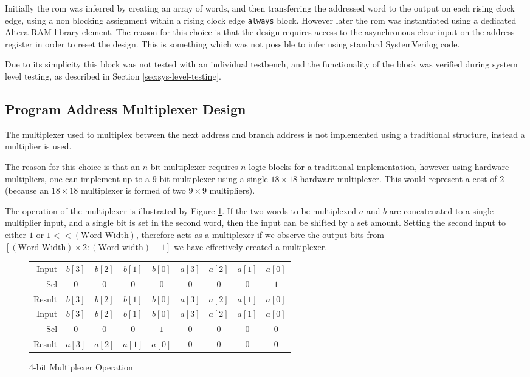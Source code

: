 Initially the \gls{rom} was inferred by creating an array of words, and then transferring the addressed word to the output on each rising clock edge, using a non blocking assignment within a rising clock edge \texttt{always} block. However later the \gls{rom} was instantiated using a dedicated Altera RAM library element. The reason for this choice is that the design requires access to the asynchronous clear input on the address register in order to reset the design. This is something which was not possible to infer using standard SystemVerilog code.

Due to its simplicity this block was not tested with an individual testbench, and the functionality of the block was verified during system level testing, as described in Section \ref{sec:sys-level-testing}.

\subsection{Program Address Multiplexer Design} \label{sec:mux-design}
The multiplexer used to multiplex between the next address and branch address is not implemented using a traditional structure, instead a multiplier is used.

The reason for this choice is that an $n$ bit multiplexer requires $n$ logic blocks for a traditional implementation, however using hardware multipliers, one can implement up to a $9$ bit multiplexer using a single $18 \times 18$ hardware multiplexer. This would represent a cost of $2$ (because an $18 \times 18$ multiplexer is formed of two $9\times9$ multipliers).

The operation of the multiplexer is illustrated by Figure \ref{fig:mux-operation}. If the two words to be multiplexed $a$ and $b$ are concatenated to a single multiplier input, and a single bit is set in the second word, then the input can be shifted by a set amount. Setting the second input to either $1$ or $1 << (\text{Word Width})$, therefore acts as a multiplexer if we observe the output bits from $[(\text{Word Width}) \times 2: (\text{Word width}) + 1]$ we have effectively created a multiplexer.

\begin{figure}[ht]
	\centering
	\begin{tabular}{r *{8}{|c}}
		Input & $b[3]$ & $b[2]$ & $b[1]$ & $b[0]$ & $a[3]$ & $a[2]$ & $a[1]$ & $a[0]$ \\
		Sel & $0$ & $0$ & $0$ & $0$ & $0$ & $0$ & $0$ & $1$  \\
		Result & \shadeCell $b[3]$ & \shadeCell $b[2]$ & \shadeCell $b[1]$ & \shadeCell $b[0]$ & $a[3]$ & $a[2]$ & $a[1]$ & $a[0]$ \\
		\midrule
		Input & $b[3]$ & $b[2]$ & $b[1]$ & $b[0]$ & $a[3]$ & $a[2]$ & $a[1]$ & $a[0]$ \\
		Sel & $0$ & $0$ & $0$ & $1$ & $0$ & $0$ & $0$ & $0$  \\
		Result & \shadeCell $a[3]$ & \shadeCell $a[2]$ & \shadeCell $a[1]$ & \shadeCell $a[0]$ & $0$ & $0$  & $0$  & $0$  \\
	\end{tabular}
	\caption{4-bit Multiplexer Operation}
	\label{fig:mux-operation}
\end{figure}

